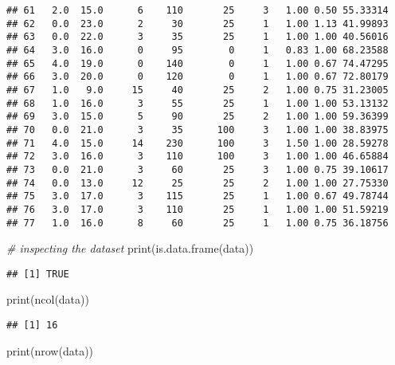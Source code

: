 \documentclass[
]{article}
\newenvironment{Shaded}{\begin{snugshade}}{\end{snugshade}}
\newcommand{\CommentTok}[1]{\textcolor[rgb]{0.56,0.35,0.01}{\textit{#1}}}
\newcommand{\FunctionTok}[1]{\textcolor[rgb]{0.00,0.00,0.00}{#1}}
\newcommand{\NormalTok}[1]{#1}
\begin{document}
\begin{verbatim}
## 61   2.0  15.0      6    110       25     3   1.00 0.50 55.33314
## 62   0.0  23.0      2     30       25     1   1.00 1.13 41.99893
## 63   0.0  22.0      3     35       25     1   1.00 1.00 40.56016
## 64   3.0  16.0      0     95        0     1   0.83 1.00 68.23588
## 65   4.0  19.0      0    140        0     1   1.00 0.67 74.47295
## 66   3.0  20.0      0    120        0     1   1.00 0.67 72.80179
## 67   1.0   9.0     15     40       25     2   1.00 0.75 31.23005
## 68   1.0  16.0      3     55       25     1   1.00 1.00 53.13132
## 69   3.0  15.0      5     90       25     2   1.00 1.00 59.36399
## 70   0.0  21.0      3     35      100     3   1.00 1.00 38.83975
## 71   4.0  15.0     14    230      100     3   1.50 1.00 28.59278
## 72   3.0  16.0      3    110      100     3   1.00 1.00 46.65884
## 73   0.0  21.0      3     60       25     3   1.00 0.75 39.10617
## 74   0.0  13.0     12     25       25     2   1.00 1.00 27.75330
## 75   3.0  17.0      3    115       25     1   1.00 0.67 49.78744
## 76   3.0  17.0      3    110       25     1   1.00 1.00 51.59219
## 77   1.0  16.0      8     60       25     1   1.00 0.75 36.18756
\end{verbatim}

\begin{Shaded}
\begin{Highlighting}[]
\CommentTok{\# inspecting the dataset}
\FunctionTok{print}\NormalTok{(}\FunctionTok{is.data.frame}\NormalTok{(data))}
\end{Highlighting}
\end{Shaded}

\begin{verbatim}
## [1] TRUE
\end{verbatim}

\begin{Shaded}
\begin{Highlighting}[]
\FunctionTok{print}\NormalTok{(}\FunctionTok{ncol}\NormalTok{(data))}
\end{Highlighting}
\end{Shaded}

\begin{verbatim}
## [1] 16
\end{verbatim}

\begin{Shaded}
\begin{Highlighting}[]
\FunctionTok{print}\NormalTok{(}\FunctionTok{nrow}\NormalTok{(data))}
\end{Highlighting}
\end{Shaded}
\end{document}
